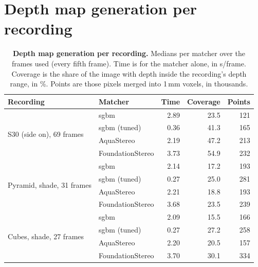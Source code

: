\section*{Depth map generation per recording}
{}
\label{app:depth_matchers}

\begin{table}[H]
\centering
\caption[Depth map generation per recording]{\textbf{Depth map generation per recording.} Medians per matcher
over the frames used (every fifth frame). Time is for the matcher alone, in s/frame. Coverage is the share of the
image with depth inside the recording's depth range, in \%. Points are those pixels merged into 1\,mm voxels, in
thousands.}
\label{tab:depth_matchers}
\small
\begin{tabular}{llrrr}
\toprule
Recording & Matcher & Time & Coverage & Points \\
\midrule
\multirow{4}{*}{S30 (side on), 69 frames} & \acrshort{sgbm}             & 2.89 & 23.5 & 121 \\
                                          & \acrshort{sgbm} (tuned)     & 0.36 & 41.3 & 165 \\
                                          & AquaStereo       & 2.19 & 47.2 & 213 \\
                                          & FoundationStereo & 3.73 & 54.9 & 232 \\
\midrule
\multirow{4}{*}{Pyramid, shade, 31 frames} & \acrshort{sgbm}             & 2.14 & 17.2 & 193 \\
                                           & \acrshort{sgbm} (tuned)     & 0.27 & 25.0 & 281 \\
                                           & AquaStereo       & 2.21 & 18.8 & 193 \\
                                           & FoundationStereo & 3.68 & 23.5 & 239 \\
\midrule
\multirow{4}{*}{Cubes, shade, 27 frames} & \acrshort{sgbm}             & 2.09 & 15.5 & 166 \\
                                         & \acrshort{sgbm} (tuned)     & 0.27 & 27.2 & 258 \\
                                         & AquaStereo       & 2.20 & 20.5 & 157 \\
                                         & FoundationStereo & 3.70 & 30.1 & 334 \\

\end{tabular}
\end{table}
